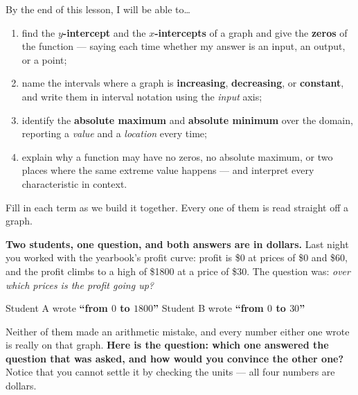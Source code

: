 \documentclass[10pt]{article}
\begin{document}

\vspace{0.15in}

\begin{objectivebox}
\small
By the end of this lesson, I will be able to\dots
\begin{enumerate}[leftmargin=1.5em, itemsep=2pt, topsep=3pt]
  \item find the \textbf{$y$-intercept} and the \textbf{$x$-intercepts} of a graph and give the
        \textbf{zeros} of the function --- saying each time whether my answer is an input, an output,
        or a point;
  \item name the intervals where a graph is \textbf{increasing}, \textbf{decreasing}, or
        \textbf{constant}, and write them in interval notation using the \emph{input} axis;
  \item identify the \textbf{absolute maximum} and \textbf{absolute minimum} over the domain,
        reporting a \emph{value} and a \emph{location} every time;
  \item explain why a function may have no zeros, no absolute maximum, or two places where the same
        extreme value happens --- and interpret every characteristic in context.
\end{enumerate}
\end{objectivebox}

\vspace{0.10in}

\boxguard
\begin{vocabbox}
\small
Fill in each term as we build it together. Every one of them is read straight off a graph.
\end{vocabbox}

\vspace{0.10in}

\boxguard[12]
\begin{hookbox}
\small
\textbf{Two students, one question, and both answers are in dollars.} Last night you worked with the
yearbook's profit curve: profit is \$0 at prices of \$0 and \$60, and the profit climbs to a high of
\$1800 at a price of \$30. The question was: \emph{over which prices is the profit going up?}

\smallskip
Student A wrote \quad \textbf{``from $0$ to $1800$''} \qquad Student B wrote \quad
\textbf{``from $0$ to $30$''}

\smallskip
Neither of them made an arithmetic mistake, and every number either one wrote is really on that
graph. \textbf{Here is the question: which one answered the question that was asked, and how would
you convince the other one?} Notice that you cannot settle it by checking the units --- all four
numbers are dollars.

\end{hookbox}
\end{document}

